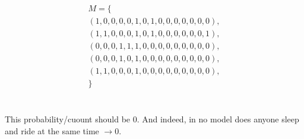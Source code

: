 \documentclass{article}
\begin{document}
\begin{gather*}
M = \bigg\{ \\
(
1, %
0, %
0, %
0, %
0, %
1, %
0, %
1, %
0, %
0, %
0, %
0, %
0, %
0, %
0  %
),\\
(
1, %
1, %
0, %
0, %
0, %
1, %
0, %
1, %
0, %
0, %
0, %
0, %
0, %
0, %
1  %
),\\
(
0, %
0, %
0, %
1, %
1, %
1, %
0, %
0, %
0, %
0, %
0, %
0, %
0, %
0, %
0  %
),\\
(
0, %
0, %
0, %
1, %
0, %
1, %
0, %
0, %
0, %
0, %
0, %
0, %
0, %
0, %
0  %
),\\
(
1, %
1, %
0, %
0, %
0, %
1, %
0, %
0, %
0, %
0, %
0, %
0, %
0, %
0, %
0  %
),\\
\bigg\}
\end{gather*}

\section{}

\subsection{}

This probability/cuount should be 0. And indeed, in no model does anyone sleep and ride at the same time $\rightarrow 0$.

\subsection{}
\end{document}
